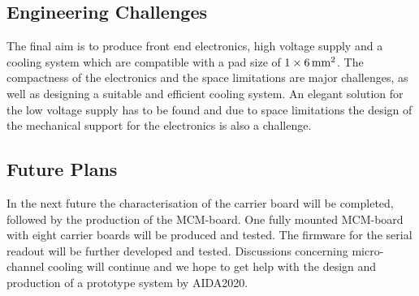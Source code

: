 \subsection{Engineering Challenges}
The final aim is to produce front end electronics, high voltage supply and a cooling system which are compatible with a pad size of $1 \times \unit[6]{mm^2}$. The compactness of the electronics and the space limitations are major challenges, as well as designing a suitable and efficient cooling system. An elegant solution for the low voltage supply has to be found and due to space limitations the design of the mechanical support for the electronics is also a challenge.

\subsection{Future Plans}
In the next future the characterisation of the carrier board will be completed, followed by the production of the MCM-board. One fully mounted MCM-board with eight carrier boards will be produced and tested. The firmware for the serial readout will be further developed and tested. Discussions concerning micro-channel cooling will continue and we hope to get help with the design and production of a prototype system by AIDA2020.
